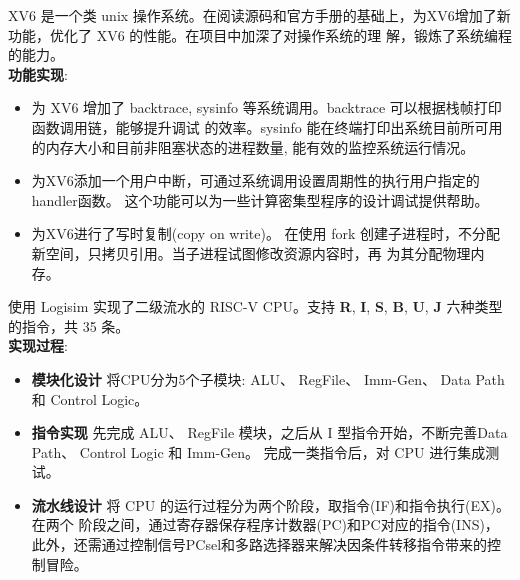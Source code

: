 \documentclass{resume}
\begin{document}
  XV6 是一个类 unix 操作系统。在阅读源码和官方手册的基础上，为XV6增加了新功能，优化了 XV6 的性能。在项目中加深了对操作系统的理
  解，锻炼了系统编程的能力。
 \\   \textbf{功能实现}:  
\begin{itemize}
 \item 为 XV6 增加了 backtrace, sysinfo 等系统调用。backtrace 可以根据栈帧打印函数调用链，能够提升调试
 的效率。sysinfo 能在终端打印出系统目前所可用的内存大小和目前非阻塞状态的进程数量, 能有效的监控系统运行情况。
 \item 为XV6添加一个用户中断，可通过系统调用设置周期性的执行用户指定的handler函数。
 这个功能可以为一些计算密集型程序的设计调试提供帮助。
 \item 为XV6进行了写时复制(copy on write)。 在使用 fork 创建子进程时，不分配新空间，只拷贝引用。当子进程试图修改资源内容时，再
 为其分配物理内存。
\end{itemize}

  使用 Logisim 实现了二级流水的 RISC-V CPU。支持 \textbf{R}, \textbf{I}, \textbf{S}, 
    \textbf{B}, \textbf{U}, \textbf{J} 六种类型的指令，共 35 条。 
 \\   \textbf{实现过程}:  
  \begin{itemize}
    \item \textbf{模块化设计 } 将CPU分为5个子模块: ALU、 RegFile、  
     Imm-Gen、 Data Path 和 Control Logic。
    \item \textbf{指令实现 } 先完成 ALU、 RegFile 模块，之后从 I 型指令开始，不断完善Data Path、 Control Logic 和 Imm-Gen。
    完成一类指令后，对 CPU 进行集成测试。
    \item \textbf{流水线设计 } 将 CPU 的运行过程分为两个阶段，取指令(IF)和指令执行(EX)。在两个
    阶段之间，通过寄存器保存程序计数器(PC)和PC对应的指令(INS)，
    此外，还需通过控制信号PCsel和多路选择器来解决因条件转移指令带来的控制冒险。 

\end{itemize}

\end{document}
